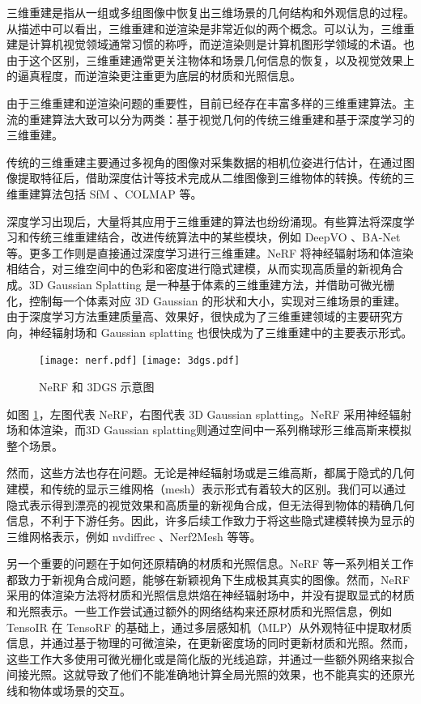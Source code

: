 三维重建是指从一组或多组图像中恢复出三维场景的几何结构和外观信息的过程。从描述中可以看出，三维重建和逆渲染是非常近似的两个概念。可以认为，三维重建是计算机视觉领域通常习惯的称呼，而逆渲染则是计算机图形学领域的术语。也由于这个区别，三维重建通常更关注物体和场景几何信息的恢复，以及视觉效果上的逼真程度，而逆渲染更注重更为底层的材质和光照信息。

由于三维重建和逆渲染问题的重要性，目前已经存在丰富多样的三维重建算法。主流的重建算法大致可以分为两类：基于视觉几何的传统三维重建和基于深度学习的三维重建。

传统的三维重建主要通过多视角的图像对采集数据的相机位姿进行估计，在通过图像提取特征后，借助深度估计等技术完成从二维图像到三维物体的转换。传统的三维重建算法包括 SfM \cite{SfM}、COLMAP \cite{COLMAP1,COLMAP2} 等。

深度学习出现后，大量将其应用于三维重建的算法也纷纷涌现。有些算法将深度学习和传统三维重建结合，改进传统算法中的某些模块，例如 DeepVO \cite{DeepVO}、BA-Net \cite{BA-Net} 等。更多工作则是直接通过深度学习进行三维重建。NeRF \cite{nerf} 将神经辐射场和体渲染相结合，对三维空间中的色彩和密度进行隐式建模，从而实现高质量的新视角合成。3D Gaussian Splatting \cite{3DGS} 是一种基于体素的三维重建方法，并借助可微光栅化，控制每一个体素对应 3D Gaussian 的形状和大小，实现对三维场景的重建。由于深度学习方法重建质量高、效果好，很快成为了三维重建领域的主要研究方向，神经辐射场和 Gaussian splatting 也很快成为了三维重建中的主要表示形式。

\begin{figure}[htbp]
  \centering
  \texttt{[image: nerf.pdf]}
  \hspace{\fill}
  \texttt{[image: 3dgs.pdf]}
  \caption{NeRF 和 3DGS 示意图}
  \label{fig:nerf-3dgs}
\end{figure}

如图 \ref{fig:nerf-3dgs}，左图代表 NeRF，右图代表 3D Gaussian splatting。NeRF 采用神经辐射场和体渲染，而3D Gaussian splatting则通过空间中一系列椭球形三维高斯来模拟整个场景。

然而，这些方法也存在问题。无论是神经辐射场或是三维高斯，都属于隐式的几何建模，和传统的显示三维网格（mesh）表示形式有着较大的区别。我们可以通过隐式表示得到漂亮的视觉效果和高质量的新视角合成，但无法得到物体的精确几何信息，不利于下游任务。因此，许多后续工作致力于将这些隐式建模转换为显示的三维网格表示，例如 nvdiffrec \cite{nvdiffrec}、Nerf2Mesh \cite{Nerf2Mesh} 等等。

另一个重要的问题在于如何还原精确的材质和光照信息。NeRF 等一系列相关工作都致力于新视角合成问题，能够在新颖视角下生成极其真实的图像。然而，NeRF 采用的体渲染方法将材质和光照信息烘焙在神经辐射场中，并没有提取显式的材质和光照表示。一些工作尝试通过额外的网络结构来还原材质和光照信息，例如 TensoIR \cite{tensoir} 在 TensoRF \cite{tensorf} 的基础上，通过多层感知机（MLP）从外观特征中提取材质信息，并通过基于物理的可微渲染，在更新密度场的同时更新材质和光照。然而，这些工作大多使用可微光栅化或是简化版的光线追踪，并通过一些额外网络来拟合间接光照。这就导致了他们不能准确地计算全局光照的效果，也不能真实的还原光线和物体或场景的交互。

